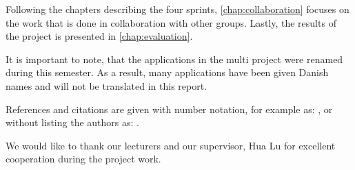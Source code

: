 Following the chapters describing the four sprints, \cref{chap:collaboration} focuses on the work that is done in collaboration with other groups.
Lastly, the results of the project is presented in \cref{chap:evaluation}.

It is important to note, that the applications in the multi project were renamed during this semester.
As a result, many applications have been given Danish names and will not be translated in this report.

References and citations are given with number notation, for example as: \citet{launcher2011}, or without listing the authors as: \cite{launcher2011}. 

We would like to thank our lecturers and our supervisor, Hua Lu for excellent cooperation during the project work.

